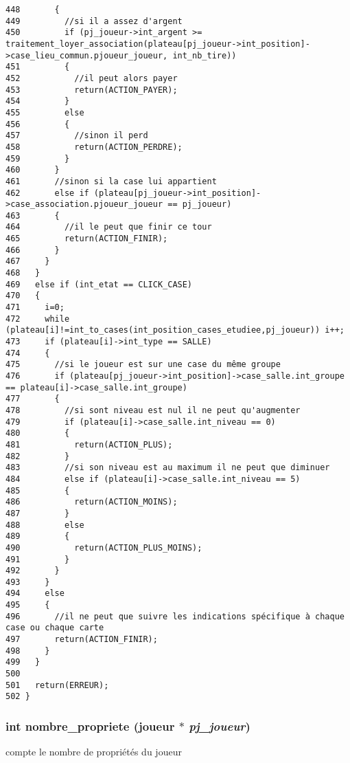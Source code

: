 \begin{Code}
\begin{verbatim}
448       {
449         //si il a assez d'argent
450         if (pj_joueur->int_argent >= traitement_loyer_association(plateau[pj_joueur->int_position]->case_lieu_commun.pjoueur_joueur, int_nb_tire))
451         {
452           //il peut alors payer
453           return(ACTION_PAYER);
454         }
455         else
456         {
457           //sinon il perd
458           return(ACTION_PERDRE);
459         }
460       }
461       //sinon si la case lui appartient
462       else if (plateau[pj_joueur->int_position]->case_association.pjoueur_joueur == pj_joueur)
463       {
464         //il le peut que finir ce tour
465         return(ACTION_FINIR);
466       }
467     }
468   }
469   else if (int_etat == CLICK_CASE)
470   {
471     i=0;
472     while (plateau[i]!=int_to_cases(int_position_cases_etudiee,pj_joueur)) i++;
473     if (plateau[i]->int_type == SALLE)
474     {
475       //si le joueur est sur une case du même groupe
476       if (plateau[pj_joueur->int_position]->case_salle.int_groupe == plateau[i]->case_salle.int_groupe)
477       {
478         //si sont niveau est nul il ne peut qu'augmenter
479         if (plateau[i]->case_salle.int_niveau == 0)
480         {
481           return(ACTION_PLUS);
482         }
483         //si son niveau est au maximum il ne peut que diminuer
484         else if (plateau[i]->case_salle.int_niveau == 5)
485         {
486           return(ACTION_MOINS);
487         }
488         else
489         {
490           return(ACTION_PLUS_MOINS);
491         }
492       }
493     }
494     else 
495     {
496       //il ne peut que suivre les indications spécifique à chaque case ou chaque carte
497       return(ACTION_FINIR);
498     }
499   }
500   
501   return(ERREUR);
502 }
\end{verbatim}\end{Code}


\subsubsection{\setlength{\rightskip}{0pt plus 5cm}int nombre\_\-propriete ({\bf joueur} $\ast$ {\em pj\_\-joueur})}\label{outils_8c_72f8d3fa346a685e363d2aa16537c971}


compte le nombre de propri\'{e}t\'{e}s du joueur 

